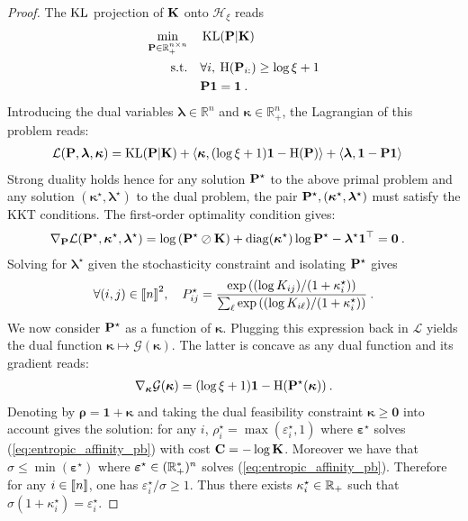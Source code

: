 \begin{proof}
The $\operatorname{KL}$ projection of $\mathbf{K}$ onto $\mathcal{H}_{\xi}$ reads
\begin{align}
    \min_{\mathbf{P} \in \mathbb{R}_+^{n \times n}} \quad &\operatorname{KL}(\mathbf{P} | \mathbf{K}) \\
    \text{s.t.} \quad &\forall i, \: \operatorname{H}(\mathbf{P}_{i:}) \geq \log{\xi} + 1 \\
    & \mathbf{P} \bm{1} = \bm{1} \:.
\end{align}
Introducing the dual variables $\bm{\lambda} \in \mathbb{R}^n$ and $\bm{\kappa} \in \mathbb{R}_+^n$, the Lagrangian of this problem reads:
\begin{align}
    \mathcal{L}(\mathbf{P}, \bm{\lambda}, \bm{\kappa}) &=  \operatorname{KL}(\mathbf{P} | \mathbf{K})  + \langle \bm{\kappa}, (\log{\xi} + 1) \bm{1} - \operatorname{H}(\mathbf{P}) \rangle + \langle \bm{\lambda}, \bm{1} - \mathbf{P} \bm{1} \rangle
\end{align}
Strong duality holds hence for any solution $\mathbf{P}^\star$ to the above primal problem and any solution $(\bm{\kappa}^\star, \bm{\lambda}^\star)$ to the dual problem, the pair $\mathbf{P}^\star, (\bm{\kappa}^\star, \bm{\lambda}^\star)$ must satisfy the KKT conditions. The first-order optimality condition gives:
\begin{align}
    \nabla_{\mathbf{P}} \mathcal{L} (\mathbf{P}^\star, \bm{\kappa}^\star, \bm{\lambda}^\star) &= \log \left( \mathbf{P}^\star \oslash \mathbf{K} \right) + \operatorname{diag}(\bm{\kappa}^\star)\log{\mathbf{P}^\star} - \bm{\lambda}^\star \bm{1}^\top = \bm{0} \:.
\end{align}
Solving for $\bm{\lambda}^\star$ given the stochasticity constraint and isolating $\mathbf{P}^\star$ gives
\begin{align}
    \forall (i,j) \in {[\![n]\!]}^2, \quad P^\star_{ij} = \frac{\exp{((\log K_{ij})/(1 + \kappa^\star_i)})}{\sum_\ell \exp{((\log K_{i\ell})/(1 + \kappa^\star_i)})} \:.
\end{align}
We now consider $\mathbf{P}^\star$ as a function of $\bm{\kappa}$. Plugging this expression back in $\mathcal{L}$ yields the dual function $\bm{\kappa} \mapsto \mathcal{G}(\bm{\kappa})$. The latter is concave as any dual function and its gradient reads:
\begin{align}
    \nabla_{\bm{\kappa}} \mathcal{G}(\bm{\kappa}) = (\log \xi + 1 )\bm{1} - \operatorname{H}(\mathbf{P}^\star(\bm{\kappa})) \:.
\end{align}
Denoting by $\bm{\rho} = \bm{1} + \bm{\kappa}$ and taking the dual feasibility constraint $\bm{\kappa} \bm{\geq} \bm{0}$ into account gives the solution: for any $i$, $\rho^\star_i = \max(\varepsilon^\star_i, 1)$ where $\bm{\varepsilon}^\star$ solves (\ref{eq:entropic_affinity_pb}) with cost $\mathbf{C} = -\log \mathbf{K}$.
Moreover we have that $\sigma \leq \min(\bm{\varepsilon}^\star)$ where $\bm{\varepsilon}^\star \in (\mathbb{R}^*_+)^n$ solves (\ref{eq:entropic_affinity_pb}). Therefore for any $i \in {[\![n]\!]}$, one has $\varepsilon_i^\star / \sigma \geq 1$. Thus there exists $\kappa_i^\star \in \mathbb{R}_+$ such that $\sigma (1 + \kappa_i^\star) = \varepsilon_i^\star$. 


\end{proof}
